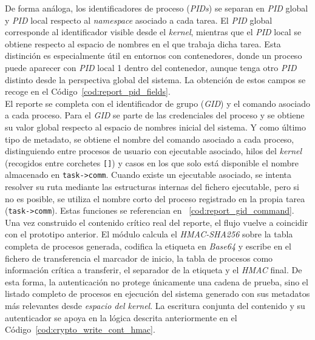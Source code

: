 De forma análoga, los identificadores de proceso (\textit{PIDs}) se separan en \textit{PID} global y \textit{PID} local respecto al \textit{namespace} asociado a cada tarea.
El \textit{PID} global corresponde al identificador visible desde el \textit{kernel}, mientras que el \textit{PID} local se obtiene respecto al espacio de nombres en el que trabaja dicha tarea.
Esta distinción es especialmente útil en entornos con contenedores, donde un proceso puede aparecer con \textit{PID} local 1 dentro del contenedor, aunque tenga otro \textit{PID} distinto desde la perspectiva global del sistema.
La obtención de estos campos se recoge en el Código~\ref{cod:report_pid_fields}.\\

El reporte se completa con el identificador de grupo (\textit{GID}) y el comando asociado a cada proceso.
Para el \textit{GID} se parte de las credenciales del proceso y se obtiene su valor global respecto al espacio de nombres inicial del sistema.
Y como último tipo de metadato, se obtiene el nombre del comando asociado a cada proceso, distinguiendo entre procesos de usuario con ejecutable asociado, hilos del \textit{kernel} (recogidos entre corchetes \texttt{[]}) y casos en los que solo está disponible el nombre almacenado en \texttt{task->comm}.
Cuando existe un ejecutable asociado, se intenta resolver su ruta mediante las estructuras internas del fichero ejecutable, pero si no es posible, se utiliza el nombre corto del proceso registrado en la propia tarea (\texttt{task->comm}).
Estas funciones se referencian en ~\ref{cod:report_gid_command}.\\

Una vez construido el contenido crítico real del reporte, el flujo vuelve a coincidir con el prototipo anterior.
El módulo calcula el \textit{HMAC-SHA256} sobre la tabla completa de procesos generada, codifica la etiqueta en \textit{Base64} y escribe en el fichero de transferencia el marcador de inicio, la tabla de procesos como información crítica a transferir, el separador de la etiqueta y el \textit{HMAC} final.
De esta forma, la autenticación no protege únicamente una cadena de prueba, sino el listado completo de procesos en ejecución del sistema generado con sus metadatos más relevantes desde \textit{espacio del kernel}.
La escritura conjunta del contenido y su autenticador se apoya en la lógica descrita anteriormente en el Código~\ref{cod:crypto_write_cont_hmac}.\\

